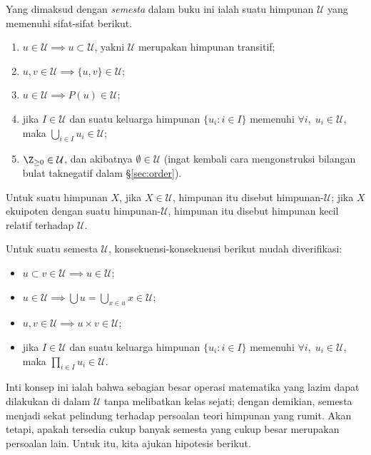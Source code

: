 \begin{definition}
	Yang dimaksud dengan \emph{semesta} dalam buku ini ialah suatu himpunan $\mathcal{U}$ yang memenuhi sifat-sifat berikut.
	\begin{enumerate}[\bfseries {U}.1]
		\item $u \in \mathcal{U} \implies u \subset \mathcal{U}$, yakni $\mathcal{U}$ merupakan himpunan transitif;
		\item $u,v \in \mathcal{U} \implies \{u, v\} \in \mathcal{U}$;
		\item $u \in \mathcal{U} \implies P(u) \in \mathcal{U}$;
		\item jika $I \in \mathcal{U}$ dan suatu keluarga himpunan $\{u_i : i \in I\}$ memenuhi $\forall i, \; u_i \in \mathcal{U}$, maka $\bigcup_{i \in I} u_i \in \mathcal{U}$;
		\item $\Z_{\geq 0} \in \mathcal{U}$, dan akibatnya $\emptyset \in \mathcal{U}$ (ingat kembali cara mengonstruksi bilangan bulat taknegatif dalam \S\ref{sec:order}).
	\end{enumerate}
	Untuk suatu himpunan $X$, jika $X \in \mathcal{U}$, himpunan itu disebut himpunan-$\mathcal{U}$; jika $X$ ekuipoten dengan suatu himpunan-$\mathcal{U}$, himpunan itu disebut himpunan kecil relatif terhadap $\mathcal{U}$.
\end{definition}

Untuk suatu semesta $\mathcal{U}$, konsekuensi-konsekuensi berikut mudah diverifikasi:
\begin{itemize}
	\item $u \subset v \in \mathcal{U} \implies u \in \mathcal{U}$;
	\item $u \in \mathcal{U} \implies \bigcup u = \bigcup_{x \in u} x  \in \mathcal{U}$;
	\item $u, v \in \mathcal{U} \implies u \times v \in \mathcal{U}$;
	\item jika $I \in \mathcal{U}$ dan suatu keluarga himpunan $\{u_i : i \in I\}$ memenuhi $\forall i, \; u_i \in \mathcal{U}$, maka $\prod_{i \in I} u_i \in \mathcal{U}$.
\end{itemize}

Inti konsep ini ialah bahwa sebagian besar operasi matematika yang lazim dapat dilakukan di dalam $\mathcal{U}$ tanpa melibatkan kelas sejati; dengan demikian, semesta menjadi sekat pelindung terhadap persoalan teori himpunan yang rumit. Akan tetapi, apakah tersedia cukup banyak semesta yang cukup besar merupakan persoalan lain. Untuk itu, kita ajukan hipotesis berikut.

